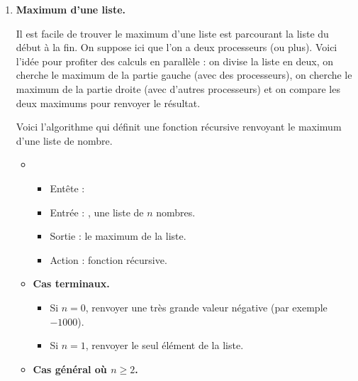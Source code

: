 \documentclass[11pt,class=report,crop=false]{standalone}
\begin{document}

\begin{activite}



  \begin{enumerate}
    \item \textbf{Maximum d'une liste.}
    
    Il est facile de trouver le maximum d'une liste est parcourant la liste du début à la fin. 
    On suppose ici que l'on a deux processeurs (ou plus). Voici l'idée pour profiter des calculs en parallèle : on divise la liste en deux, on cherche le maximum de la partie gauche (avec des processeurs), on cherche le maximum de la partie droite (avec d'autres processeurs) et on compare les deux maximums pour renvoyer le résultat. 
    
    Voici l'algorithme qui définit une fonction récursive  renvoyant le maximum d'une liste de nombre.
    
\begin{algorithme}
\sauteligne 
\begin{itemize}
 
  \item 
  \begin{itemize}
    \item Entête : 
    \item Entrée : , une liste de $n$ nombres.
    \item Sortie : le maximum de la liste.
    \item Action : fonction récursive.
  \end{itemize} 
  
  \item \textbf{Cas terminaux.}
  \begin{itemize}
     \item Si $n=0$, renvoyer une très grande valeur négative (par exemple $-1000$).
     \item Si $n=1$, renvoyer le seul élément de la liste.
   \end{itemize}   
   
   
  \item \textbf{Cas général où $n\ge2$.}
  

\end{itemize}
\end{algorithme}
\end{enumerate}
\end{activite}
\end{document}
